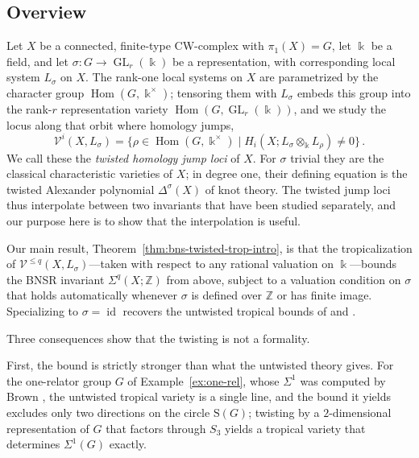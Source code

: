 \documentclass[11pt]{amsart}
\theoremstyle{definition}
\newcommand{\Z}{\mathbb{Z}}
\renewcommand{\k}{\Bbbk}
\newcommand{\VV}{\mathcal{V}}
\newcommand{\rS}{\mathrm{S}}
\DeclareMathOperator{\id}{id}
\DeclareMathOperator{\GL}{GL}
\DeclareMathOperator{\Hom}{{Hom}}
\begin{document}
\subsection{Overview}
\label{intro:overview}
Let $X$ be a connected, finite-type CW-complex with $\pi_1(X)=G$, let
$\k$ be a field, and let $\sigma\colon G\to \GL_r(\k)$ be a
representation, with corresponding local system $L_\sigma$ on $X$.
The rank-one local systems on $X$ are parametrized by the character
group $\Hom(G,\k^{\times})$; tensoring them with $L_\sigma$ embeds this
group into the rank-$r$ representation variety $\Hom(G,\GL_r(\k))$, and
we study the locus along that orbit where homology jumps,
\begin{equation*}
\VV^i(X,L_\sigma)=\big\{\rho \in \Hom(G,\k^{\times}) \mid
H_i(X; L_\sigma\otimes_{\k} L_{\rho}) \ne 0\big\}\, .
\end{equation*}
We call these the \emph{twisted homology jump loci}\/ of $X$.  For
$\sigma$ trivial they are the classical characteristic varieties of $X$;
in degree one, their defining equation is the twisted Alexander
polynomial $\Delta^{\sigma}(X)$ of knot theory.  The twisted jump loci
thus interpolate between two invariants that have been studied
separately, and our purpose here is to show that the interpolation is
useful.

Our main result, Theorem~\ref{thm:bns-twisted-trop-intro}, is that the
tropicalization of $\VV^{\le q}(X,L_\sigma)$---taken with respect to any
rational valuation on $\k$---bounds the BNSR invariant $\Sigma^q(X;\Z)$
from above, subject to a valuation condition on $\sigma$ that holds
automatically whenever $\sigma$ is defined over $\Z$ or has finite
image.  Specializing to $\sigma=\id$ recovers the untwisted tropical
bounds of \cite{Su-mathann} and \cite{LL}.

Three consequences show that the twisting is not a formality.

First, the bound is strictly stronger than what the untwisted theory
gives.  For the one-relator group $G$ of Example~\ref{ex:one-rel},
whose $\Sigma^1$ was computed by Brown \cite{Br}, the untwisted
tropical variety is a single line, and the bound it yields excludes only
two directions on the circle $\rS(G)$; twisting by a $2$-dimensional
representation of $G$ that factors through $S_3$ yields a tropical
variety that determines $\Sigma^1(G)$ exactly.
\end{document}
